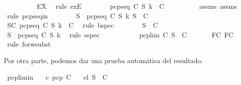 \begin{isabellebody}
\ \ \ \ \ \ \ \ \isamarkupfalse%
\ EX\ \isamarkupfalse%
\ {\isacharparenleft}rule\ exE{\isacharparenright}\isanewline
\ \ \ \ \ \ \isamarkupfalse%
\ {\isachardoublequoteopen}pcp{\isacharunderscore}seq\ C\ S\ k\ {\isasymin}\ C{\isachardoublequoteclose}\isanewline
\ \ \ \ \ \ \ \ \isamarkupfalse%
\ assms{\isacharparenleft}{}{\isacharparenright}\ assms{\isacharparenleft}{}{\isacharparenright}\ \isamarkupfalse%
\ {\isacharparenleft}rule\ pcp{\isacharunderscore}seq{\isacharunderscore}in{\isacharparenright}\isanewline
\ \ \ \ \ \ \isamarkupfalse%
\ {\isachardoublequoteopen}{\isasymforall}S{\isacharprime}\ {\isasymsubseteq}\ {\isacharparenleft}pcp{\isacharunderscore}seq\ C\ S\ k{\isacharparenright}{\isachardot}\ S{\isacharprime}\ {\isasymin}\ C{\isachardoublequoteclose}\isanewline
\ \ \ \ \ \ \ \ \isamarkupfalse%
\ SC\ {\isacartoucheopen}pcp{\isacharunderscore}seq\ C\ S\ k\ {\isasymin}\ C{\isacartoucheclose}\ \isamarkupfalse%
\ {\isacharparenleft}rule\ bspec{\isacharparenright}\isanewline
\ \ \ \ \ \ \isamarkupfalse%
\ {\isachardoublequoteopen}S{\isacharprime}\ {\isasymin}\ C{\isachardoublequoteclose}\isanewline
\ \ \ \ \ \ \ \ \isamarkupfalse%
\ {\isacartoucheopen}S{\isacharprime}\ {\isasymsubseteq}\ pcp{\isacharunderscore}seq\ C\ S\ k{\isacartoucheclose}\ \isamarkupfalse%
\ {\isacharparenleft}rule\ sspec{\isacharparenright}\isanewline
\ \ \ \ \isamarkupfalse%
\isanewline
\ \ \isamarkupfalse%
\isanewline
\ \ \isamarkupfalse%
\ {\isachardoublequoteopen}pcp{\isacharunderscore}lim\ C\ S\ {\isasymin}\ C{\isachardoublequoteclose}\ \isanewline
\ \ \ \ \isamarkupfalse%
\ FC{}\ FC{}\ \isamarkupfalse%
\ {\isacharparenleft}rule\ forw{\isacharunderscore}subst{\isacharparenright}\isanewline
{}\isamarkupfalse%
%
\endisatagproof
{\isafoldproof}%
%
\isadelimproof
%
\endisadelimproof
%
\begin{isamarkuptext}%
Por otra parte, podemos dar una prueba automática del resultado.%
\end{isamarkuptext}\isamarkuptrue%
\isamarkupfalse%
\ pcp{\isacharunderscore}lim{\isacharunderscore}in{\isacharcolon}\isanewline
\ \ \ c{\isacharcolon}\ {\isachardoublequoteopen}pcp\ C{\isachardoublequoteclose}\isanewline
\ \ \ el{\isacharcolon}\ {\isachardoublequoteopen}S\ {\isasymin}\ C{\isachardoublequoteclose}\isanewline

\end{isabellebody}
